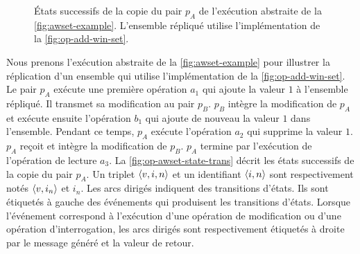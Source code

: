 \begin{figure}[bth]
\centering
{}
\caption[États successifs de la copie du pair $p_A$ de l'exécution abstraite de la \autoref{fig:awset-example}]{États successifs de la copie du pair $p_A$ de l'exécution abstraite de la \autoref{fig:awset-example}.
L'ensemble répliqué utilise l'implémentation de la \autoref{fig:op-add-win-set}.}\label{fig:op-awset-state-trans}
\end{figure}

Nous prenons l'exécution abstraite de la \autoref{fig:awset-example} pour illustrer la réplication d'un ensemble qui utilise l'implémentation de la \autoref{fig:op-add-win-set}.
Le pair $p_A$ exécute une première opération $a_1$ qui ajoute la valeur $1$ à l'ensemble répliqué.
Il transmet sa modification au pair $p_B$.
$p_B$ intègre la modification de $p_A$ et exécute ensuite l'opération $b_1$ qui ajoute de nouveau la valeur $1$ dans l'ensemble.
Pendant ce temps, $p_A$ exécute l'opération $a_2$ qui supprime la valeur $1$.
$p_A$ reçoit et intègre la modification de $p_B$.
$p_A$ termine par l'exécution de l'opération de lecture $a_3$.
La \autoref{fig:op-awset-state-trans} décrit les états successifs de la copie du pair $p_A$.
Un triplet $\tuple*{v, i, n}$ et un identifiant $\tuple*{i, n}$ sont respectivement notés $\tuple*{v, i_n}$ et $i_n$.
Les arcs dirigés indiquent des transitions d'états.
Ils sont étiquetés à gauche des événements qui produisent les transitions d'états.
Lorsque l'événement correspond à l'exécution d'une opération de modification ou d'une opération d'interrogation, les arcs dirigés sont respectivement étiquetés à droite par le message généré et la valeur de retour.

